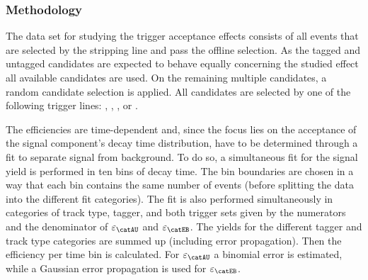 \subsubsection{Methodology}
\label{sec:measurement_of_sin2beta:resolution_and_acceptance:acceptance:lower:methodology}

The data set for studying the trigger acceptance effects consists of all events
that are selected by the \StrippingDetached stripping line and pass the
offline selection. As the tagged and untagged candidates are expected to behave
equally concerning the studied effect all available candidates are used.
On the remaining multiple candidates, a random candidate selection is applied.
All candidates are selected by one of the following trigger lines:
\HLTOneDiMuonHighMass, \HLTOneTrackMuon, \HLTTwoDiMuonJpsi, or
\HLTTwoDiMuonDetachedJpsi.

The efficiencies are time-dependent and, since the focus lies on the acceptance
of the signal component's decay time distribution, have to be determined through
a fit to separate signal from background. To do so, a simultaneous fit for the
signal yield is performed in ten bins of decay time. The bin boundaries are
chosen in a way that each bin contains the same number of events (before
splitting the data into the different fit categories). The fit is also performed
simultaneously in categories of track type, tagger, and both trigger sets given
by the numerators and the denominator of $\varepsilon_\text{\catAU}$ and
$\varepsilon_\text{\catEB}$. The yields for the different tagger and track type
categories are summed up (including error propagation). Then the efficiency per
time bin is calculated. For $\varepsilon_{\catAU}$ a binomial error is
estimated, while a Gaussian error propagation is used for
$\varepsilon_{\catEB}$.

